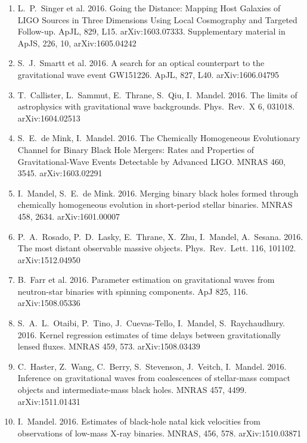 \documentclass[margin,line]{res}
\begin{document}
\begin{resume}
\begin{enumerate}
\item L.~P.~Singer et al. 2016.  Going the Distance: Mapping Host Galaxies of LIGO Sources in Three Dimensions Using Local Cosmography and Targeted Follow-up.  ApJL, 829, L15. arXiv:1603.07333.   Supplementary material in ApJS, 226, 10, arXiv:1605.04242

\item S.~J.~Smartt et al.  2016.  A search for an optical counterpart to the gravitational wave event GW151226.  ApJL, 827, L40. arXiv:1606.04795

\item T.~Callister, L.~Sammut, E.~Thrane, S.~Qiu, I.~Mandel.  2016. The limits of astrophysics with gravitational wave backgrounds. Phys.~Rev.~X 6, 031018.  arXiv:1604.02513

\item S.~E.~de Mink, I.~Mandel. 2016. The Chemically Homogeneous Evolutionary Channel for Binary Black Hole Mergers: Rates and Properties of Gravitational-Wave Events Detectable by Advanced LIGO.  MNRAS 460, 3545.  arXiv:1603.02291

\item I.~Mandel, S.~E.~de Mink.  2016.  Merging binary black holes formed through chemically homogeneous evolution in short-period stellar binaries. MNRAS 458, 2634. arXiv:1601.00007

\item P.~A.~Rosado, P.~D.~Lasky, E.~Thrane, X.~Zhu, I.~Mandel, A.~Sesana.  2016. The most distant observable massive objects.  Phys.~Rev.~Lett. 116, 101102.  arXiv:1512.04950

\item B.~Farr et al. 2016. Parameter estimation on gravitational waves from neutron-star binaries with spinning components. ApJ 825, 116. arXiv:1508.05336

\item S.~A.~L.~Otaibi, P.~Tino, J.~Cuevas-Tello, I.~Mandel, S.~Raychaudhury.  2016.  Kernel regression estimates of time delays between gravitationally lensed fluxes.  MNRAS 459, 573.  arXiv:1508.03439

\item C.~Haster, Z.~Wang, C.~Berry, S.~Stevenson, J.~Veitch, I.~Mandel.  2016. Inference on gravitational waves from coalescences of stellar-mass compact objects and intermediate-mass black holes.   MNRAS 457, 4499.  arXiv:1511.01431 

\item I.~Mandel. 2016. Estimates of black-hole natal kick velocities from observations of low-mass X-ray binaries. MNRAS, 456, 578. arXiv:1510.03871


\end{enumerate}
\end{resume}
\end{document}
